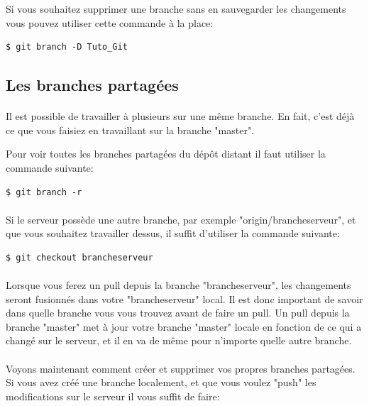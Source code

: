 \documentclass[french, a4paper, 12pt, titlepage]{article}
\begin{document}
Si vous souhaitez supprimer une branche sans en sauvegarder les changements vous pouvez utiliser cette commande à la place:
\begin{lstlisting}
$ git branch -D Tuto_Git
\end{lstlisting}

\subsection{Les branches partagées}
\paragraph{}Il est possible de travailler à plusieurs sur une même branche. En fait, c’est déjà ce que vous faisiez en travaillant sur la branche "master".

Pour voir toutes les branches partagées du dépôt distant il faut utiliser la commande suivante:
\begin{lstlisting}
$ git branch -r
\end{lstlisting}

\paragraph{} Si le serveur possède une autre branche, par exemple
"origin/brancheserveur", et que vous souhaitez travailler dessus, il suffit
d'utiliser la commande suivante:

\begin{lstlisting}
$ git checkout brancheserveur
\end{lstlisting}

\paragraph{}Lorsque vous ferez un pull depuis la branche "brancheserveur", les changements seront fusionnés dans votre "brancheserveur" local. Il est donc important de savoir dans quelle branche vous vous trouvez avant de faire un pull. Un pull depuis la branche "master" met à jour votre branche "master" locale en fonction de ce qui a changé sur le serveur, et il en va de même pour n’importe quelle autre branche.

\paragraph{} Voyons maintenant comment créer et supprimer vos propres branches
partagées. Si vous avez créé une branche localement, et que vous voulez "push"
les modifications sur le serveur il vous suffit de faire:
\end{document}
